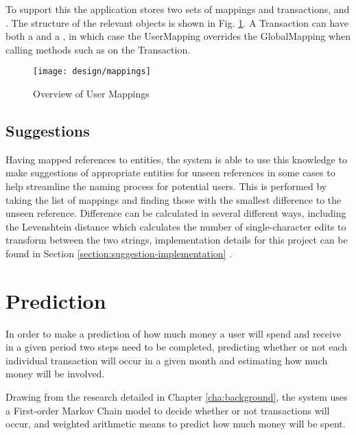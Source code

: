 To support this the application stores two sets of mappings and transactions,  and . The structure of the relevant objects is shown in Fig. \ref{fig:transactormappings}. A Transaction can have both a  and a  , in which case the UserMapping overrides the GlobalMapping when calling methods such as  on the Transaction.

\begin{figure}[h]
    \centering
    \texttt{[image: design/mappings]}
    \caption{Overview of User Mappings}
    \label{fig:transactormappings}
    
    \begin{comment}
[Transaction]<>*-0..1[UserMapping]
[Transaction]<>*-0..1-[GlobalMapping]
[User]<>-*[UserMapping]
[UserMapping]<>*-[UserTransactor]
[UserTransactor]<>*-[Category]
[GlobalTransactor]<>*-[Category]
[GlobalMapping]<>*-[GlobalTransactor]
    \end{comment}
\end{figure}

\subsection{Suggestions}
Having mapped \glspl{reference} to entities, the system is able to use this knowledge to make suggestions of appropriate entities for unseen references in some cases to help streamline the naming process for potential users.
%
This is performed by taking the list of mappings and finding those with the smallest difference to the unseen reference. Difference can be calculated in several different ways, including the Levenshtein distance which calculates the number of single-character edits to transform between the two strings, implementation details for this project can be found in Section \ref{section:suggestion-implementation} \cite{levenshtein1966binary}.

\section{Prediction}
In order to make a prediction of how much money a user will spend and receive in a given period two steps need to be completed, predicting whether or not each individual transaction will occur in a given month and estimating how much money will be involved.

Drawing from the research detailed in Chapter \ref{cha:background}, the system uses a First-order Markov Chain model to decide whether or not transactions will occur, and weighted arithmetic means to predict how much money will be spent.

